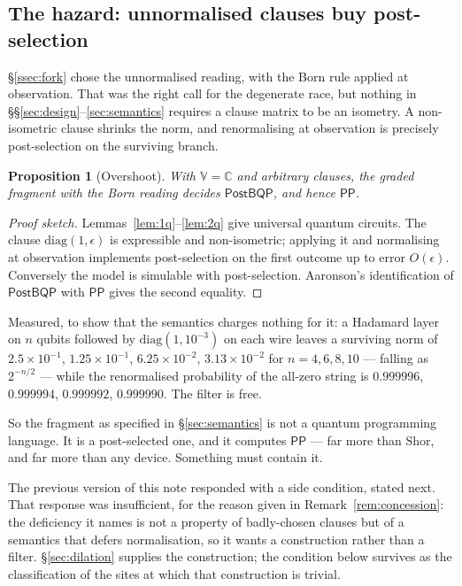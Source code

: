 \documentclass[11pt,a4paper]{article}
\theoremstyle{plain}
\newtheorem{proposition}[theorem]{Proposition}
\theoremstyle{definition}
\theoremstyle{remark}
\newcommand{\V}{\mathbb{V}}
\newcommand{\Cx}{\mathbb{C}}
\begin{document}
\subsection{The hazard: unnormalised clauses buy post-selection}\label{ssec:hazard}

\S\ref{ssec:fork} chose the unnormalised reading, with the Born rule applied at
observation. That was the right call for the degenerate race, but nothing in
\S\S\ref{sec:design}--\ref{sec:semantics} requires a clause matrix to be an
isometry. A non-isometric clause shrinks the norm, and renormalising at
observation is precisely post-selection on the surviving branch.

\begin{proposition}[Overshoot]\label{prop:postbqp}
With $\V = \Cx$ and arbitrary clauses, the graded fragment with the Born reading
decides $\mathsf{PostBQP}$, and hence $\mathsf{PP}$.
\end{proposition}

\begin{proof}[Proof sketch]
Lemmas~\ref{lem:1q}--\ref{lem:2q} give universal quantum circuits. The clause
$\mathrm{diag}(1,\epsilon)$ is expressible and non-isometric; applying it and
normalising at observation implements post-selection on the first outcome up to
error $O(\epsilon)$. Conversely the model is simulable with post-selection.
Aaronson's identification of $\mathsf{PostBQP}$ with $\mathsf{PP}$ gives the
second equality.
\end{proof}

Measured, to show that the semantics charges nothing for it: a Hadamard layer on
$n$ qubits followed by $\mathrm{diag}(1,10^{-3})$ on each wire leaves a surviving
norm of $2.5\times 10^{-1}$, $1.25\times 10^{-1}$, $6.25\times 10^{-2}$,
$3.13\times 10^{-2}$ for $n = 4,6,8,10$ --- falling as $2^{-n/2}$ --- while the
renormalised probability of the all-zero string is
$0.999996$, $0.999994$, $0.999992$, $0.999990$. The filter is free.

So the fragment as specified in \S\ref{sec:semantics} is not a quantum
programming language. It is a post-selected one, and it computes $\mathsf{PP}$
--- far more than Shor, and far more than any device. Something must contain it.

The previous version of this note responded with a side condition, stated next.
That response was insufficient, for the reason given in
Remark~\ref{rem:concession}: the deficiency it names is not a property of
badly-chosen clauses but of a semantics that defers normalisation, so it wants a
construction rather than a filter. \S\ref{sec:dilation} supplies the
construction; the condition below survives as the classification of the sites at
which that construction is trivial.
\end{document}
